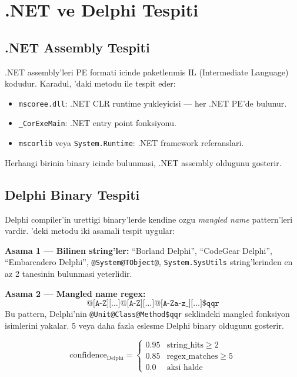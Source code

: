 \section{.NET ve Delphi Tespiti}
\label{sec:dotnet-delphi}

\subsection{.NET Assembly Tespiti}

.NET assembly'leri PE formati icinde paketlenmis IL (Intermediate Language) kodudur. Karadul, 'daki  metodu ile tespit eder:

\begin{itemize}
\item \texttt{mscoree.dll}: .NET CLR runtime yukleyicisi --- her .NET PE'de bulunur.
\item \texttt{\_CorExeMain}: .NET entry point fonksiyonu.
\item \texttt{mscorlib} veya \texttt{System.Runtime}: .NET framework referanslari.
\end{itemize}

Herhangi birinin binary icinde bulunmasi, .NET assembly oldugunu gosterir.

\subsection{Delphi Binary Tespiti}

Delphi compiler'in urettigi binary'lerde kendine ozgu \emph{mangled name} pattern'leri vardir. 'deki  metodu iki asamali tespit uygular:

\textbf{Asama 1 --- Bilinen string'ler:} ``Borland Delphi'', ``CodeGear Delphi'', ``Embarcadero Delphi'', \texttt{@System@TObject@}, \texttt{System.SysUtils} string'lerinden en az 2 tanesinin bulunmasi yeterlidir.

\textbf{Asama 2 --- Mangled name regex:}
\begin{equation}
\label{eq:delphi-regex}
\texttt{@[A-Z][\ldots]@[A-Z][\ldots]@[A-Za-z\_][\ldots]\$qqr}
\end{equation}
Bu pattern, Delphi'nin \texttt{@Unit@Class@Method\$qqr} seklindeki mangled fonksiyon isimlerini yakalar. 5 veya daha fazla eslesme Delphi binary oldugunu gosterir.

\begin{equation}
\label{eq:delphi-confidence}
\text{confidence}_{\text{Delphi}} =
\begin{cases}
0.95 & \text{string\_hits} \geq 2 \\
0.85 & \text{regex\_matches} \geq 5 \\
0.0  & \text{aksi halde}
\end{cases}
\end{equation}


